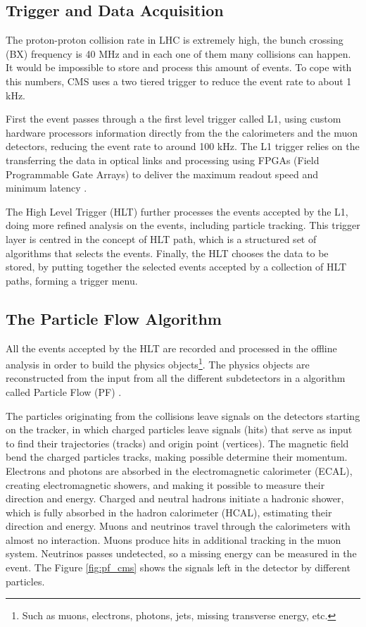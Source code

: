 \subsection{Trigger and Data Acquisition}

The proton-proton collision rate in LHC is extremely high, the bunch crossing (BX) frequency is 40 MHz and in each one of them many collisions can happen. It would be impossible to store and process this amount of events. To cope with this numbers, CMS uses a two tiered trigger to reduce the event rate to about 1 kHz.

First the event passes through a the first level trigger called L1, using custom hardware processors information directly from the the calorimeters and the muon detectors, reducing the event rate to around 100 kHz. The L1 trigger relies on the transferring the data in optical links and processing using FPGAs (Field Programmable Gate Arrays) to deliver the maximum readout speed and minimum latency \cite{CMS:2020cmk}.

The High Level Trigger (HLT) further processes the events accepted by the L1, doing more refined analysis on the events, including particle tracking. This trigger layer is centred in the concept of HLT path, which is a structured set of algorithms that selects the events. Finally, the HLT chooses the data to be stored, by putting together the selected events accepted by a collection of HLT paths, forming a trigger menu.

\subsection{The Particle Flow Algorithm}

All the events accepted by the HLT are recorded and processed in the offline analysis in order to build the physics objects\footnote{Such as muons, electrons, photons, jets, missing transverse energy, etc.}. The physics objects are reconstructed from the input from all the different subdetectors in a algorithm called Particle Flow (PF) \cite{CMS:2017yfk}.

The particles originating from the collisions leave signals on the detectors starting on the tracker, in which charged particles leave signals (hits) that serve as input to find their trajectories (tracks) and origin point (vertices). The magnetic field bend the charged particles tracks, making possible determine their momentum. Electrons and photons are absorbed in the electromagnetic calorimeter (ECAL), creating electromagnetic showers, and making it possible to measure their direction and energy. Charged and neutral hadrons initiate a hadronic shower, which is fully absorbed in the hadron calorimeter (HCAL), estimating their direction and energy. Muons and neutrinos travel through the calorimeters with almost no interaction. Muons produce hits in additional tracking in the muon system. Neutrinos passes undetected, so a missing energy can be measured in the event. The Figure \ref{fig:pf_cms} shows the signals left in the detector by different particles.

